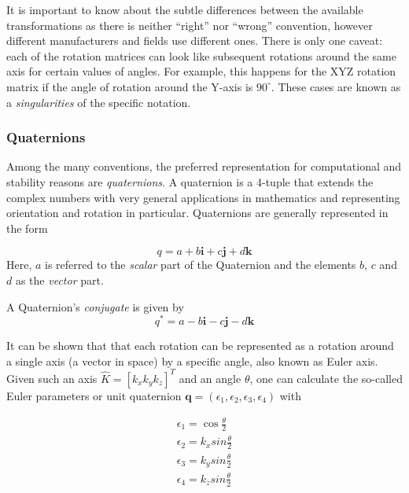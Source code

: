 It is important to know about the subtle differences between the available transformations as there is neither ``right'' nor ``wrong'' convention, however different manufacturers and fields use different ones.
There is only one caveat: each of the rotation matrices can look like subsequent rotations around the same axis for certain values of angles. For example, this happens for the XYZ rotation matrix if the angle of rotation around the Y-axis is $90^\circ$. These cases are known as a \textsl{singularities} of the specific notation.

\subsubsection{Quaternions}

Among the many conventions, the preferred representation for computational and stability reasons are \textsl{quaternions}.
A quaternion is a 4-tuple that extends the complex numbers with very general applications in mathematics and representing orientation and rotation in particular. Quaternions are generally represented in the form

\begin{equation}
q=a+b\mathbf{i}+c\mathbf{j}+d\mathbf{k}
\end{equation}
Here, $a$ is referred to the \emph{scalar} part of the Quaternion and the elements $b$, $c$ and $d$ as the \emph{vector} part. 

A Quaternion's \emph{conjugate} is given by
\begin{equation}
q^*=a-b\mathbf{i}-c\mathbf{j}-d\mathbf{k}
\end{equation}


It can be shown that that each rotation can be represented as a rotation around a single axis (a vector in space) by a specific angle, also known as Euler axis. Given such an axis $ \hat{K}=[k_x k_y k_z]^T$ and an angle $\theta$, one can calculate the so-called Euler parameters or unit quaternion $\textbf{q}=(\epsilon_1,\epsilon_2,\epsilon_3,\epsilon_4)$ with

\begin{eqnarray}
\epsilon_1=\cos \frac{\theta}{2}\\
\epsilon_2=k_x sin \frac{\theta}{2}\\
\epsilon_3=k_y sin \frac{\theta}{2}\\
\epsilon_4=k_z sin\frac{\theta}{2}
\end{eqnarray}

